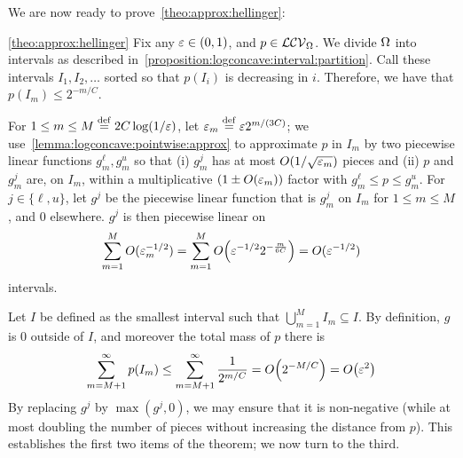 \noindent We are now ready to prove~\cref{theo:approx:hellinger}:
\begin{proofof}{\cref{theo:approx:hellinger}}
Fix any $\eps\in(0,1)$, and $p\in\classlogconcave[\domain]$. We divide $\domain$ into intervals as described in~\cref{proposition:logconcave:interval:partition}. Call these intervals $I_1,I_2,\ldots$ sorted so that $p(I_i)$ is decreasing in $i$. Therefore, we have that $p(I_m) \leq 2^{-m/C}$.

For $1 \leq m \leq M\eqdef 2C\log(1/\eps)$, let $\eps_m\eqdef \eps 2^{m/(3C)}$; we use~\cref{lemma:logconcave:pointwise:approx} to approximate $p$ in $I_m$ by two piecewise linear functions $g^{\ell}_m, g^u_m$ so that (i) $g^j_m$ has at most $O(1/\sqrt{\eps_m})$ pieces and (ii) $p$ and $g^j_m$ are, on $I_m$, within a multiplicative $(1\pm O(\eps_m))$ factor with $g^{\ell}_m \leq p\leq g^u_m$. For $j\in\{\ell,u\}$, let $g^j$ be the piecewise linear function that is $g^j_m$ on $I_m$ for $1\leq m\leq M$, and $0$ elsewhere. $g^j$ is then piecewise linear on
\[
\sum_{m=1}^{M} O(\eps_m^{-1/2}) = \sum_{m=1}^{M} \bigO{ \eps^{-1/2} 2^{-\frac{m}{6C}} } = O(\eps^{-1/2})
\]
intervals.

Let $I$ be defined as the smallest interval such that $\bigcup_{m=1}^M I_m\subseteq I$. By definition, $g$ is $0$ outside of $I$, and moreover the total mass of $p$ there is
\[
  \sum_{m=M+1}^\infty p(I_m) \leq \sum_{m=M+1}^\infty \frac{1}{2^{m/C}} = \bigO{2^{-M/C}} = \bigO{\eps^2}
\]
By replacing $g^j$ by $\max(g^j,0)$, we may ensure that it is non-negative (while at most doubling the number of pieces without increasing the distance from $p$). This establishes the first two items of the theorem; we now turn to the third.


\end{proofof}
